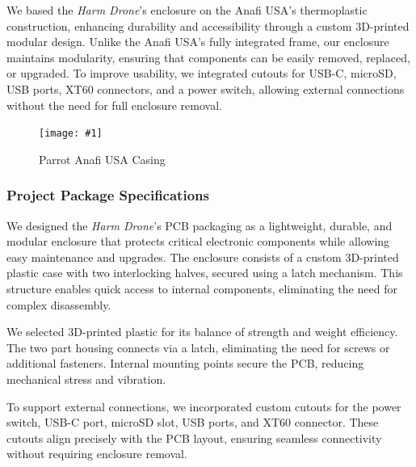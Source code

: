 \documentclass[12pt]{article}
\newcommand{\quickfigure}[4]{%
\begin{figure}[!htbp]
\centering
\texttt{[image: \#1]}
\caption{#3}
\label{#4}
\end{figure}%
}
\begin{document}
\par We based the \textit{Harm Drone}’s enclosure on the Anafi USA’s thermoplastic construction, enhancing durability and accessibility through a custom 3D-printed modular design. Unlike the Anafi USA’s fully integrated frame, our enclosure maintains modularity, ensuring that components can be easily removed, replaced, or upgraded. To improve usability, we integrated cutouts for USB-C, microSD, USB ports, XT60 connectors, and a power switch, allowing external connections without the need for full enclosure removal.

\quickfigure{images/parrot-anafi-USA-casing.jpg}{7.5cm}{Parrot Anafi USA Casing}{parrot-anafi-usa-casing}

\subsubsection{Project Package Specifications}

\par We designed the \textit{Harm Drone}’s PCB packaging as a lightweight, durable, and modular enclosure that protects critical electronic components while allowing easy maintenance and upgrades. The enclosure consists of a custom 3D-printed plastic case with two interlocking halves, secured using a latch mechanism. This structure enables quick access to internal components, eliminating the need for complex disassembly.

\par We selected 3D-printed plastic for its balance of strength and weight efficiency. The two part housing connects via a latch, eliminating the need for screws or additional fasteners. Internal mounting points secure the PCB, reducing mechanical stress and vibration.

\par To support external connections, we incorporated custom cutouts for the power switch, USB-C port, microSD slot, USB ports, and XT60 connector. These cutouts align precisely with the PCB layout, ensuring seamless connectivity without requiring enclosure removal.
\end{document}
